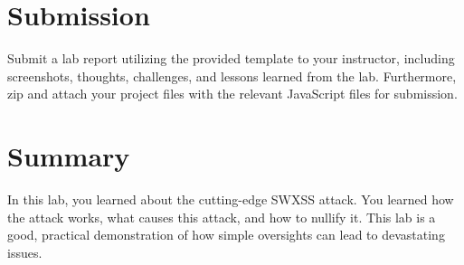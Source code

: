 \documentclass[letterpaper,12pt]{report}
\begin{document}

\section*{Submission}\label{sec:Submission}

Submit a lab report utilizing the provided template to your instructor, including screenshots, thoughts, challenges, and lessons learned from the lab. Furthermore, zip and attach your project files with the relevant JavaScript files for submission.


\section*{Summary}\label{sec:Summary}

In this lab, you learned about the cutting-edge SWXSS attack. You learned how the attack works, what causes this attack, and how to nullify it. This lab is a good, practical demonstration of how simple oversights can lead to devastating issues.



\end{document}

